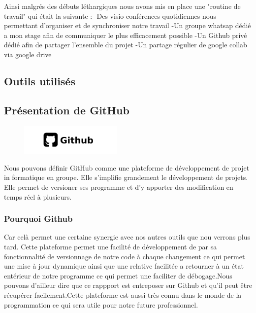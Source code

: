 Ainsi malgrés des débuts léthargiques nous avons mis en place une "routine de travail" qui était la suivante :
-Des visio-conférences quotidiennes nous permettant d'organiser et de synchroniser notre travail
-Un groupe whatsap dédié a mon stage afin de communiquer le plus efficacement possible
-Un Github privé dédié afin de partager l'ensemble du projet
-Un partage régulier de google collab via google drive

%

\subsection{Outils utilisés}

\subsection{Présentation de GitHub}

\begin{figure}[h]
  \begin{center}
  \includegraphics[width=5cm]{./images/github.jpg}
  \end{center}
\end{figure}

Nous pouvons définir GitHub comme une plateforme de développement de projet in formatique en groupe. Elle s'implifie grandement le développement de projets. Elle permet de versioner ses programme et d'y apporter des modification en temps réel à plusieurs.

\subsubsection{Pourquoi Github}
Car celà permet une certaine synergie avec nos autres outils que nou verrons plus tard. Cette plateforme permet une facilité de développement de par sa fonctionnalité de versionnage de notre code à chaque changement ce qui permet une mise à jour dynamique ainsi que une relative facilitée a retourner à un état entérieur de notre programme ce qui permet une faciliter de débogage.Nous pouvons d'ailleur dire que ce rappport est entreposer sur Github et qu'il peut être récupérer facilement.Cette plateforme est aussi très connu dans le monde de la programmation ce qui sera utile pour notre future professionnel.

